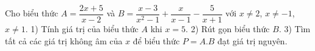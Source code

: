 
\begin{bt}

Cho biểu thức $A = \dfrac{2x+5}{x-2}$ và $B = \dfrac{x-3}{x^2-1} + \dfrac{x}{x-1} - \dfrac{5}{x+1}$ với $x \ne 2$, $x \ne -1$, $x \ne 1$.
1) Tính giá trị của biểu thức $A$ khi $x = 5$.
2) Rút gọn biểu thức $B$.
3) Tìm tất cả các giá trị không âm của $x$ để biểu thức $P = A.B$ đạt giá trị nguyên.
\loigiai{
}
\end{bt}
